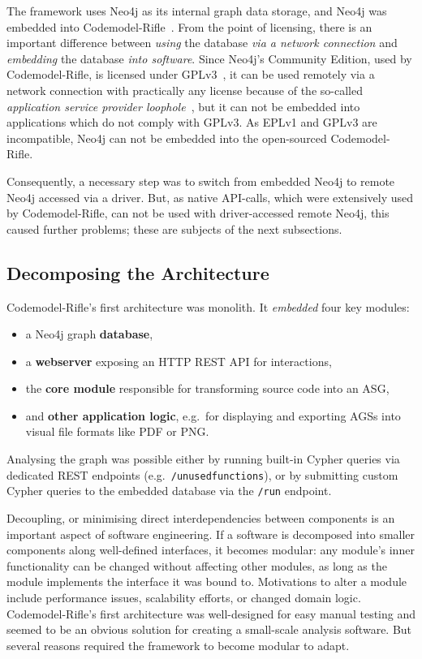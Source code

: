The framework uses Neo4j as its internal graph data storage, and Neo4j was embedded into Codemodel-Rifle~\cite{stein-daniel-msc}. From the point of licensing, there is an important difference between \emph{using} the database \emph{via a network connection} and \emph{embedding} the database \emph{into software}. Since Neo4j's Community Edition, used by Codemodel-Rifle, is licensed under GPLv3~\cite{neo4j-licensing}, it can be used remotely via a network connection with practically any license because of the so-called \emph{application service provider loophole}~\cite{asp-loophole}, but it can not be embedded into applications which do not comply with GPLv3. As EPLv1 and GPLv3 are incompatible, Neo4j can not be embedded into the open-sourced Codemodel-Rifle.

Consequently, a necessary step was to switch from embedded Neo4j to remote Neo4j accessed via a driver. But, as native API-calls, which were extensively used by Codemodel-Rifle, can not be used with driver-accessed remote Neo4j, this caused further problems; these are subjects of the next subsections.


\subsection{Decomposing the Architecture}

Codemodel-Rifle's first architecture was monolith. It \emph{embedded} four key modules:

\begin{itemize}
\item a Neo4j graph \textbf{database},
\item a \textbf{webserver} exposing an HTTP REST API for interactions,
\item the \textbf{core module} responsible for transforming source code into an ASG,
\item and \textbf{other application logic}, e.g.\ for displaying and exporting AGSs into visual file formats like PDF or PNG.
\end{itemize}

Analysing the graph was possible either by running built-in Cypher queries via dedicated REST endpoints (e.g.\ \lstinline{/unusedfunctions}), or by submitting custom Cypher queries to the embedded database via the \lstinline{/run} endpoint.

Decoupling, or minimising direct interdependencies between components is an important aspect of software engineering. If a software is decomposed into smaller components along well-defined interfaces, it becomes modular: any module's inner functionality can be changed without affecting other modules, as long as the module implements the interface it was bound to. Motivations to alter a module include performance issues, scalability efforts, or changed domain logic. Codemodel-Rifle's first architecture was well-designed for easy manual testing and seemed to be an obvious solution for creating a small-scale analysis software. But several reasons required the framework to become modular to adapt.


